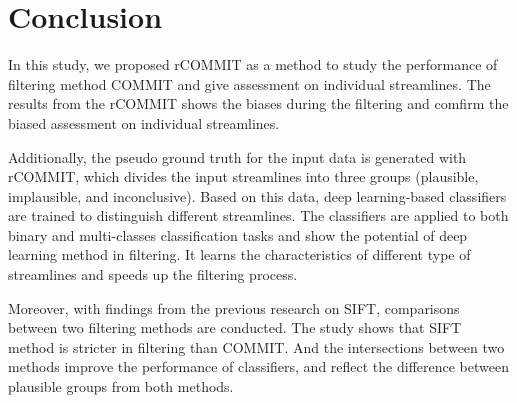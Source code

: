 \chapter{Conclusion}
In this study, we proposed rCOMMIT as a method to study the performance of 
filtering method COMMIT and give assessment on individual streamlines. 
The results from the rCOMMIT shows the biases during the filtering and comfirm the 
biased assessment on individual streamlines. 

Additionally, the pseudo ground truth for the input data is generated with rCOMMIT,
which divides the input streamlines into three groups (plausible, implausible, and inconclusive).
Based on this data, deep learning-based classifiers are trained to distinguish different streamlines.
The classifiers are applied to both binary and multi-classes classification tasks and 
show the potential of deep learning method in filtering. 
It learns the characteristics of different type of streamlines 
and speeds up the filtering process.  

Moreover, with findings from the previous research on SIFT, comparisons between two filtering
methods are conducted. The study shows that SIFT method is stricter in filtering than COMMIT.
And the intersections between two methods improve the performance of classifiers, and reflect the difference
between plausible groups from both methods. 
